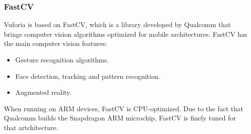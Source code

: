 \subsubsection{FastCV}
Vuforia is based on FastCV, which is a library developed by Qualcomm that brings
computer vision algorithms optimized for mobile architectures. FastCV has the main
computer vision features\cite{fastcv}:
\begin{itemize}
\item Gesture recognition algorithms.
\item Face detection, tracking and pattern recognition.
\item Augmented reality.
\end{itemize}

When running on ARM devices, FastCV is CPU-optimized. Due to the fact that Qualcomm
builds the Snapdragon ARM microchip, FastCV is finely tuned for that artchitecture. 
